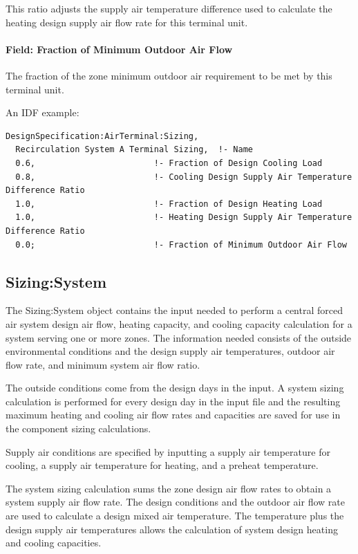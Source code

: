 This ratio adjusts the supply air temperature difference used to calculate the heating design supply air flow rate for this terminal unit.

\paragraph{Field: Fraction of Minimum Outdoor Air Flow}\label{fraction-of-minimum-outdoor-air-requirement}

The fraction of the zone minimum outdoor air requirement to be met by this terminal unit.

An IDF example:

\begin{lstlisting}
DesignSpecification:AirTerminal:Sizing,
  Recirculation System A Terminal Sizing,  !- Name
  0.6,                        !- Fraction of Design Cooling Load
  0.8,                        !- Cooling Design Supply Air Temperature Difference Ratio
  1.0,                        !- Fraction of Design Heating Load
  1.0,                        !- Heating Design Supply Air Temperature Difference Ratio
  0.0;                        !- Fraction of Minimum Outdoor Air Flow
\end{lstlisting}

\subsection{Sizing:System}\label{sizingsystem}

The Sizing:System object contains the input needed to perform a central forced air system design air flow, heating capacity, and cooling capacity calculation for a system serving one or more zones. The information needed consists of the outside environmental conditions and the design supply air temperatures, outdoor air flow rate, and minimum system air flow ratio.

The outside conditions come from the design days in the input. A system sizing calculation is performed for every design day in the input file and the resulting maximum heating and cooling air flow rates and capacities are saved for use in the component sizing calculations.

Supply air conditions are specified by inputting a supply air temperature for cooling, a supply air temperature for heating, and a preheat temperature.

The system sizing calculation sums the zone design air flow rates to obtain a system supply air flow rate. The design conditions and the outdoor air flow rate are used to calculate a design mixed air temperature. The temperature plus the design supply air temperatures allows the calculation of system design heating and cooling capacities.

